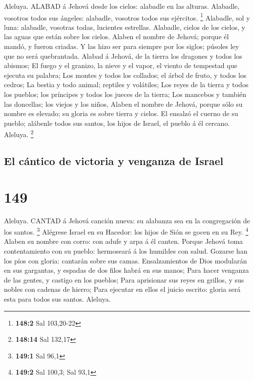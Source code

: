  Aleluya. ALABAD á Jehová desde los cielos: alabadle en las
alturas.  Alabadle, vosotros todos sus ángeles: alabadle,
vosotros todos sus ejércitos. \footnote{\textbf{148:2} Sal 103,20-22}
 Alabadle, sol y luna: alabadle, vosotras todas, lucientes
estrellas.  Alabadle, cielos de los cielos, y las aguas que
están sobre los cielos.  Alaben el nombre de Jehová; porque
él mandó, y fueron criadas.  Y las hizo ser para siempre por
los siglos; púsoles ley que no será quebrantada.  Alabad á
Jehová, de la tierra los dragones y todos los abismos;  El
fuego y el granizo, la nieve y el vapor, el viento de tempestad que
ejecuta su palabra;  Los montes y todos los collados; el
árbol de fruto, y todos los cedros;  La bestia y todo
animal; reptiles y volátiles;  Los reyes de la tierra y
todos los pueblos; los príncipes y todos los jueces de la tierra;
 Los mancebos y también las doncellas; los viejos y los
niños,  Alaben el nombre de Jehová, porque sólo su nombre
es elevado; su gloria es sobre tierra y cielos.  El ensalzó
el cuerno de su pueblo; alábenle todos sus santos, los hijos de Israel,
el pueblo á él cercano. Aleluya. \footnote{\textbf{148:14} Sal 132,17}

\hypertarget{el-cuxe1ntico-de-victoria-y-venganza-de-israel}{%
\subsection{El cántico de victoria y venganza de
Israel}\label{el-cuxe1ntico-de-victoria-y-venganza-de-israel}}

\hypertarget{section-148}{%
\section{149}\label{section-148}}

 Aleluya. CANTAD á Jehová canción nueva: su alabanza sea en
la congregación de los santos. \footnote{\textbf{149:1} Sal 96,1}
 Alégrese Israel en su Hacedor: los hijos de Sión se gocen
en su Rey. \footnote{\textbf{149:2} Sal 100,3; Sal 93,1} 
Alaben su nombre con corro: con adufe y arpa á él canten. 
Porque Jehová toma contentamiento con su pueblo: hermoseará á los
humildes con salud.  Gozarse han los píos con gloria:
cantarán sobre sus camas.  Ensalzamientos de Dios modularán
en sus gargantas, y espadas de dos filos habrá en sus manos;
 Para hacer venganza de las gentes, y castigo en los
pueblos;  Para aprisionar sus reyes en grillos, y sus nobles
con cadenas de hierro;  Para ejecutar en ellos el juicio
escrito: gloria será esta para todos sus santos. Aleluya.

